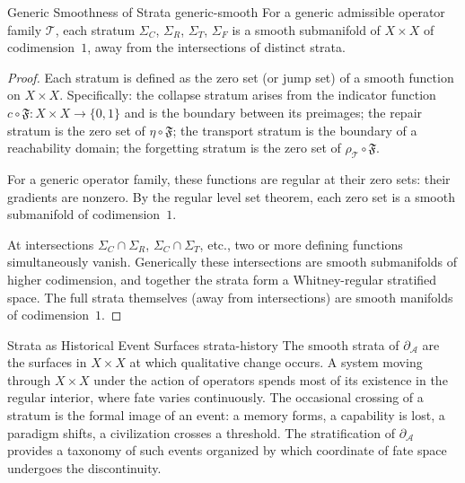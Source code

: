 \documentclass[12pt,twoside,openright]{book}
\newcommand{\transfam}{\mathcal{T}}       %
\newcommand{\distPairs}{X\times X}
\newcommand{\fateMap}{\mathfrak{F}}
\newcommand{\survRatio}{\rho}             %
\newcommand{\repEff}{\eta}               %
\newcommand{\collapseInd}{c}             %
\newcommand{\singSet}{\partial_{\!\mathcal{A}}}
\newcommand{\strataC}{\Sigma_{C}}   %
\newcommand{\strataR}{\Sigma_{R}}   %
\newcommand{\strataT}{\Sigma_{T}}   %
\newcommand{\strataF}{\Sigma_{F}}   %
\providecommand{\strataC}{\Sigma_{C}}
\providecommand{\strataR}{\Sigma_{R}}
\providecommand{\strataT}{\Sigma_{T}}
\providecommand{\strataF}{\Sigma_{F}}
\providecommand{\singSet}{\partial_{\!\mathcal{A}}}
\begin{document}
\begin{theorem}{Generic Smoothness of Strata}%
  {generic-smooth}
For a generic admissible operator family $\transfam$, each
stratum $\strataC$, $\strataR$, $\strataT$, $\strataF$ is a
smooth submanifold of $\distPairs$ of codimension~$1$, away
from the intersections of distinct strata.
\begin{proof}
Each stratum is defined as the zero set (or jump set) of a
smooth function on $\distPairs$. Specifically: the collapse
stratum arises from the indicator function
$\collapseInd\circ\fateMap:\distPairs\to\{0,1\}$ and is the
boundary between its preimages; the repair stratum is the zero
set of $\repEff\circ\fateMap$; the transport stratum is the
boundary of a reachability domain; the forgetting stratum is
the zero set of $\survRatio_\transfam\circ\fateMap$.

For a generic operator family, these functions are regular at
their zero sets: their gradients are nonzero. By the regular
level set theorem, each zero set is a smooth submanifold of
codimension~$1$.

At intersections $\strataC\cap\strataR$, $\strataC\cap\strataT$,
etc., two or more defining functions simultaneously vanish.
Generically these intersections are smooth submanifolds of
higher codimension, and together the strata form a
Whitney-regular stratified space. The full strata themselves
(away from intersections) are smooth manifolds of
codimension~$1$.
\end{proof}
\end{theorem}

\begin{remark}{Strata as Historical Event Surfaces}%
  {strata-history}
The smooth strata of $\singSet$ are the surfaces in
$\distPairs$ at which qualitative change occurs. A system
moving through $\distPairs$ under the action of operators spends
most of its existence in the regular interior, where fate
varies continuously. The occasional crossing of a stratum is
the formal image of an event: a memory forms, a capability is
lost, a paradigm shifts, a civilization crosses a threshold.
The stratification of $\singSet$ provides a taxonomy of such
events organized by which coordinate of fate space undergoes
the discontinuity.
\end{remark}
\end{document}
